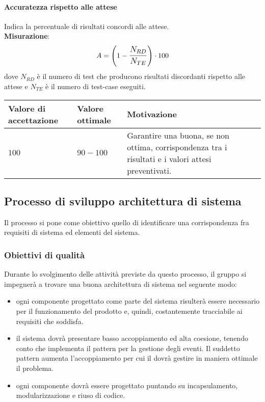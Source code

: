 \paragraph{Accuratezza rispetto alle attese}
Indica la percentuale di risultati concordi alle attese. \\
\textbf{Misurazione}: 
		$$A=\left(1-\mathlarger{\frac{N_{RD}}{N_{TE}}}\right) \cdot 100$$
	dove $N_{RD}$ è il numero di test che producono risultati discordanti rispetto alle attese e $N_{TE}$ è il numero di test-case eseguiti.
	
\begin{center}
	\begin{tabular}{|P{2.5cm}|P{2.5cm}|P{6cm}|}
		\hline
			\textbf{Valore di accettazione}	& \textbf{Valore ottimale} & \textbf{Motivazione} \\
			\hline
			$100$ & $90 - 100$ & Garantire una buona, se non ottima, corrispondenza tra i risultati e i valori attesi preventivati. \\
			\hline
			\end{tabular}
\end{center}	

\subsection{Processo di sviluppo architettura di sistema}

Il processo si pone come obiettivo quello di identificare una corrispondenza fra requisiti di sistema ed elementi del sistema.
\subsubsection{Obiettivi di qualità}
Durante lo svolgimento delle attività previste da questo processo, il gruppo si impegnerà a trovare una buona architettura di sistema nel seguente modo:
\begin{itemize}
\item ogni componente progettato come parte del sistema risulterà essere necessario per il funzionamento del prodotto e, quindi, costantemente tracciabile ai requisiti che soddisfa.
\item il sistema dovrà presentare basso accoppiamento ed alta coesione, tenendo conto che  implementa il pattern  per la gestione degli eventi. Il suddetto pattern aumenta l'accoppiamento per cui il  dovrà gestire in maniera ottimale il problema.
\item ogni componente dovrà essere progettato puntando su incapsulamento, modularizzazione e riuso di codice.
\end{itemize}
\newpage

